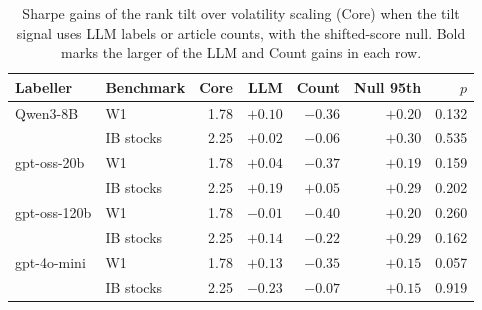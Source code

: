 \begin{table}[!t]
\centering
\caption{Sharpe gains of the rank tilt over volatility scaling (Core) when the tilt signal uses LLM labels or article counts, with the shifted-score null. Bold marks the larger of the LLM and Count gains in each row.}
\label{tab:controls}
{\small
\setlength{\tabcolsep}{4pt}
\begin{tabular*}{\textwidth}{@{\extracolsep{\fill}}llrrrrr}
\toprule
Labeller & Benchmark & Core & LLM & Count & Null 95th & $p$ \\
\midrule
Qwen3-8B     & W1        & 1.78 & $\mathbf{+0.10}$ & $-0.36$ & $+0.20$ & 0.132 \\
             & IB stocks & 2.25 & $\mathbf{+0.02}$ & $-0.06$ & $+0.30$ & 0.535 \\
gpt-oss-20b  & W1        & 1.78 & $\mathbf{+0.04}$ & $-0.37$ & $+0.19$ & 0.159 \\
             & IB stocks & 2.25 & $\mathbf{+0.19}$ & $+0.05$ & $+0.29$ & 0.202 \\
gpt-oss-120b & W1        & 1.78 & $\mathbf{-0.01}$ & $-0.40$ & $+0.20$ & 0.260 \\
             & IB stocks & 2.25 & $\mathbf{+0.14}$ & $-0.22$ & $+0.29$ & 0.162 \\
gpt-4o-mini  & W1        & 1.78 & $\mathbf{+0.13}$ & $-0.35$ & $+0.15$ & 0.057 \\
             & IB stocks & 2.25 & $-0.23$ & $\mathbf{-0.07}$ & $+0.15$ & 0.919 \\
\bottomrule
\end{tabular*}}
\end{table}

